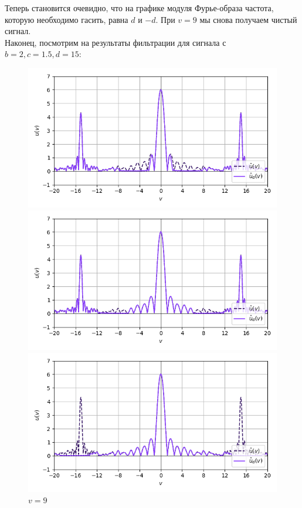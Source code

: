 \documentclass[a4paper]{article}
\begin{document}
Теперь становится очевидно, что на графике модуля Фурье-образа частота, которую необходимо гасить, равна $d$ и $-d$. При $v = 9$ мы снова получаем чистый сигнал.\\[0.5em]
Наконец, посмотрим на результаты фильтрации для сигнала с $b=2, c=1.5, d=15$:
\begin{figure}[H]
    \begin{minipage}{0.33\textwidth}
        \centering \includegraphics[width=\textwidth]{sources/band-stop filter/fourier (b=2, c=1.5, d=15, v=5).png}
        \caption{$v = 5$}
    \end{minipage}\hfill
    \begin{minipage}{0.33\textwidth}
        \centering \includegraphics[width=\textwidth]{sources/band-stop filter/fourier (b=2, c=1.5, d=15, v=9).png}
        \caption{$v = 9$}
    \end{minipage}\hfill
    \begin{minipage}{0.33\textwidth}
        \centering \includegraphics[width=\textwidth]{sources/band-stop filter/fourier (b=2, c=1.5, d=15, v=16).png}

\end{minipage}
\end{figure}
\end{document}
